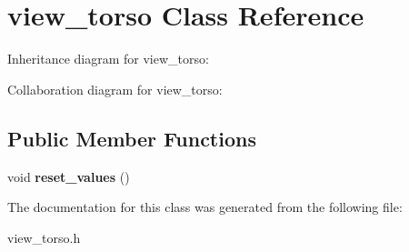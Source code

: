 \hypertarget{classview__torso}{}\section{view\+\_\+torso Class Reference}
\label{classview__torso}


Inheritance diagram for view\+\_\+torso\+:


Collaboration diagram for view\+\_\+torso\+:
\subsection*{Public Member Functions}
\begin{DoxyCompactItemize}
\item 
void {\bfseries reset\+\_\+values} ()\hypertarget{classview__torso_a2b0dd06fa3afa55c5e5be707fe2b542f}{}\label{classview__torso_a2b0dd06fa3afa55c5e5be707fe2b542f}

\end{DoxyCompactItemize}


The documentation for this class was generated from the following file\+:\begin{DoxyCompactItemize}
\item 
view\+\_\+torso.\+h\end{DoxyCompactItemize}
